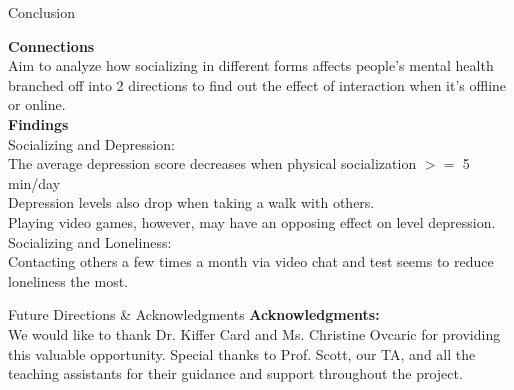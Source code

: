 \documentclass{beamer}
\begin{document}
\begin{frame}{Conclusion}

\textbf{Connections}\\
Aim to analyze how socializing in different forms affects people’s mental health\\
branched off into 2 directions to find out the effect of  interaction when it's offline or online.\\

\textbf{Findings}\\ 
Socializing and Depression:\\
The average depression score decreases when physical socialization $>=$ 5 min/day\\
Depression levels also drop when taking a walk with others.\\
Playing video games, however, may have an opposing effect on level depression.\\
Socializing and Loneliness:\\
Contacting others a few times a month via video chat and test seems to reduce loneliness the most.\\

    
\end{frame}

\begin{frame}{Future Directions & Acknowledgments}
\textbf{Acknowledgments:}\\
We would like to thank Dr. Kiffer Card and Ms. Christine Ovcaric for providing this valuable opportunity. Special thanks to Prof. Scott, our TA, and all the teaching assistants for their guidance and support throughout the project.
\end{frame}
\end{document}
